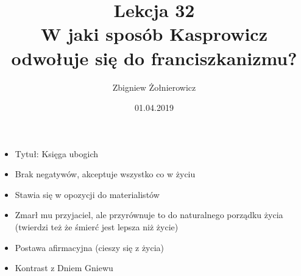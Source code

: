 \documentclass[a4paper]{article}
\begin{document}
\title{
        {\huge Lekcja 32} \\
        {\large W jaki sposób Kasprowicz odwołuje się do franciszkanizmu?}
}
\author{Zbigniew Żołnierowicz}
\date{01.04.2019}
\maketitle
\begin{itemize}
    \item Tytuł: Księga ubogich
    \item Brak negatywów, akceptuje wszystko co w życiu
    \item Stawia się w opozycji do materialistów
    \item Zmarł mu przyjaciel, ale przyrównuje to do naturalnego porządku życia (twierdzi też że śmierć jest lepsza niż życie)
    \item Postawa afirmacyjna (cieszy się z życia)
    \item Kontrast z Dniem Gniewu
\end{itemize}
\end{document}
